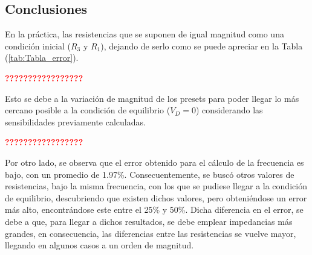 \subsection{Conclusiones}

En la práctica, las resistencias que se suponen de igual magnitud como una condición inicial ($R_3$ y $R_1$), dejando de serlo como se puede apreciar en la Tabla (\ref{tab:Tabla_error}).
\begin{center}
	\huge{\textcolor{red}{\textbf{?????????????????}}}
\end{center}
Esto se debe a la variación de magnitud de los presets para poder llegar lo más cercano posible a la condición de equilibrio ($V_D=0$) considerando las sensibilidades previamente calculadas.
\begin{center}
	\huge{\textcolor{red}{\textbf{?????????????????}}}
\end{center}
Por otro lado, se observa que el error obtenido para el cálculo de la frecuencia es bajo, con un promedio de 1.97\%. Consecuentemente, se buscó otros valores de resistencias, bajo la misma frecuencia, con los que se pudiese llegar a la condición de equilibrio, descubriendo que existen dichos valores, pero obteniéndose un error más alto, encontrándose este entre el 25\% y 50\%. Dicha diferencia en el error, se debe a que, para llegar a dichos resultados, se debe emplear impedancias más grandes, en consecuencia, las diferencias entre las resistencias se vuelve mayor, llegando en algunos casos a un orden de magnitud.


